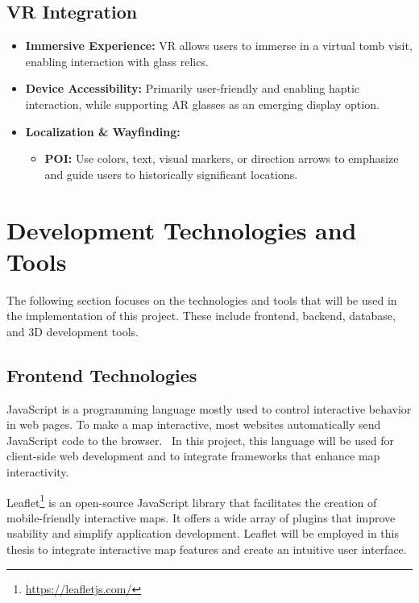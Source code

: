 \subsection*{\gls{VR} Integration}
\begin{itemize}
    \item \textbf{Immersive Experience:} \gls{VR} allows users to immerse in a virtual tomb visit, enabling interaction with glass relics.
    \item \textbf{Device Accessibility:} Primarily user-friendly and enabling haptic interaction, while supporting \gls{AR} glasses as an emerging display option.
    \item \textbf{Localization \& Wayfinding:} 
    \begin{itemize}
        \item \textbf{\gls{POI}:} Use colors, text, visual markers, or direction arrows to emphasize and guide users to historically significant locations.
    \end{itemize}
\end{itemize}

\section{Development Technologies and Tools}
\label{sec:technologies}

The following section focuses on the technologies and tools that will be used in the implementation of this project. These include frontend, backend, database, and \gls{3D} development tools.

\subsection{Frontend Technologies}
\label{sec:frontend}

JavaScript is a programming language mostly used to control interactive behavior in web
pages. To make a map interactive, most websites automatically send JavaScript code to the browser.~\cite{ajayi2024utilizing} In this project, this language will be used for client-side web development and to integrate frameworks that enhance map interactivity.

Leaflet\footnote{\url{https://leafletjs.com/}} is an open-source JavaScript library that facilitates the creation of mobile-friendly interactive maps. It offers a wide array of plugins that improve usability and simplify application development.
Leaflet will be employed in this thesis to integrate interactive map features and create an intuitive user interface.

